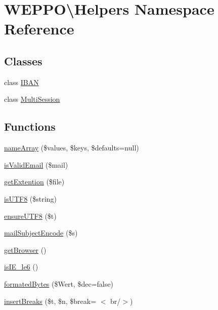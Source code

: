 \hypertarget{namespaceWEPPO_1_1Helpers}{}\section{W\+E\+P\+PO\textbackslash{}Helpers Namespace Reference}
\label{namespaceWEPPO_1_1Helpers}
\subsection*{Classes}
\begin{DoxyCompactItemize}
\item 
class \hyperlink{classWEPPO_1_1Helpers_1_1IBAN}{I\+B\+AN}
\item 
class \hyperlink{classWEPPO_1_1Helpers_1_1MultiSession}{Multi\+Session}
\end{DoxyCompactItemize}
\subsection*{Functions}
\begin{DoxyCompactItemize}
\item 
\hyperlink{namespaceWEPPO_1_1Helpers_a74b2707f3efbcfd966872e605458ff96}{name\+Array} (\$values, \$keys, \$defaults=null)
\item 
\hyperlink{namespaceWEPPO_1_1Helpers_a8f09da65a77ba4732e5cc4087f5b6310}{is\+Valid\+Email} (\$mail)
\item 
\hyperlink{namespaceWEPPO_1_1Helpers_a891ecb1686a8bcca73bd18b5adeb6112}{get\+Extention} (\$file)
\item 
\hyperlink{namespaceWEPPO_1_1Helpers_add9a10540194b2592cabffda29e10d6e}{is\+U\+T\+F8} (\$string)
\item 
\hyperlink{namespaceWEPPO_1_1Helpers_a7aba6be7d2fd50163e778914dfcb6176}{ensure\+U\+T\+F8} (\$t)
\item 
\hyperlink{namespaceWEPPO_1_1Helpers_a9518f7e4142ca1ab4903c96a57a663fb}{mail\+Subject\+Encode} (\$s)
\item 
\hyperlink{namespaceWEPPO_1_1Helpers_a9719eff55311d90c76062e465fd86f47}{get\+Browser} ()
\item 
\hyperlink{namespaceWEPPO_1_1Helpers_ad88c8357abb00c4c69823295f108a9c0}{is\+I\+E\+\_\+le6} ()
\item 
\hyperlink{namespaceWEPPO_1_1Helpers_ac35584046e823ceda19ca5aea4e861d0}{formated\+Bytes} (\$Wert, \$dec=false)
\item 
\hyperlink{namespaceWEPPO_1_1Helpers_a695175f776034e529fcd7592c408412b}{insert\+Breaks} (\$t, \$n, \$break= \textquotesingle{}$<$ br/$>$\textquotesingle{})
\end{DoxyCompactItemize}
